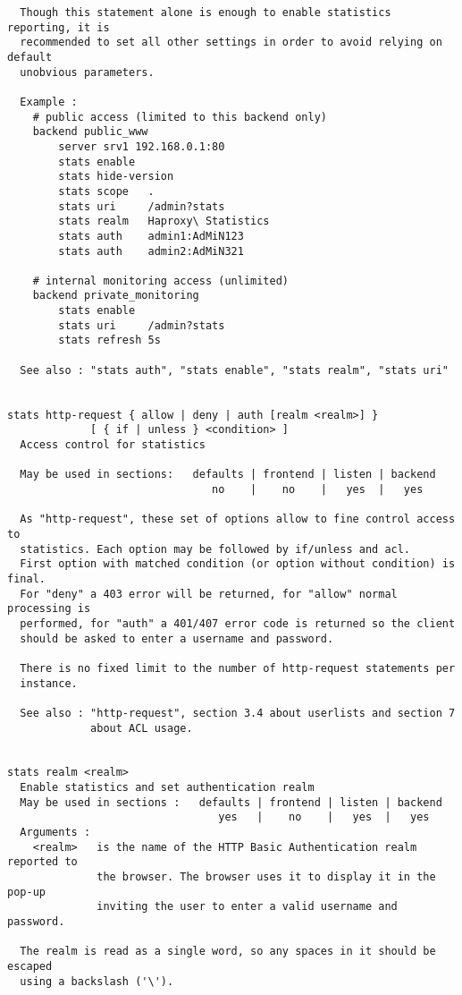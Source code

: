 \begin{verbatim}
  Though this statement alone is enough to enable statistics reporting, it is
  recommended to set all other settings in order to avoid relying on default
  unobvious parameters.

  Example :
    # public access (limited to this backend only)
    backend public_www
        server srv1 192.168.0.1:80
        stats enable
        stats hide-version
        stats scope   .
        stats uri     /admin?stats
        stats realm   Haproxy\ Statistics
        stats auth    admin1:AdMiN123
        stats auth    admin2:AdMiN321

    # internal monitoring access (unlimited)
    backend private_monitoring
        stats enable
        stats uri     /admin?stats
        stats refresh 5s

  See also : "stats auth", "stats enable", "stats realm", "stats uri"


stats http-request { allow | deny | auth [realm <realm>] }
             [ { if | unless } <condition> ]
  Access control for statistics

  May be used in sections:   defaults | frontend | listen | backend
                                no    |    no    |   yes  |   yes

  As "http-request", these set of options allow to fine control access to
  statistics. Each option may be followed by if/unless and acl.
  First option with matched condition (or option without condition) is final.
  For "deny" a 403 error will be returned, for "allow" normal processing is
  performed, for "auth" a 401/407 error code is returned so the client
  should be asked to enter a username and password.

  There is no fixed limit to the number of http-request statements per
  instance.

  See also : "http-request", section 3.4 about userlists and section 7
             about ACL usage.


stats realm <realm>
  Enable statistics and set authentication realm
  May be used in sections :   defaults | frontend | listen | backend
                                 yes   |    no    |   yes  |   yes
  Arguments :
    <realm>   is the name of the HTTP Basic Authentication realm reported to
              the browser. The browser uses it to display it in the pop-up
              inviting the user to enter a valid username and password.

  The realm is read as a single word, so any spaces in it should be escaped
  using a backslash ('\').


\end{verbatim}
